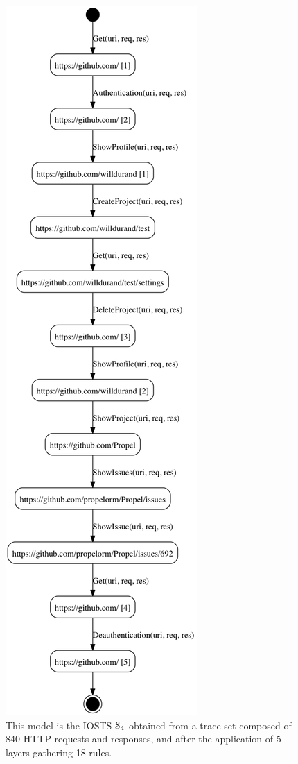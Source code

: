 \begin{figure}[ht]
    \begin{center}
        \includegraphics[width=.45\textwidth]{figures/gh-2-4-bis.png}
    \end{center}

    \caption {This model is the IOSTS $\EuScript{S}_4$ obtained
    from a trace set composed of 840 HTTP requests and responses,
    and after the application of 5 layers gathering 18 rules.}
    \label{fig:git:iosts}
\end{figure}


